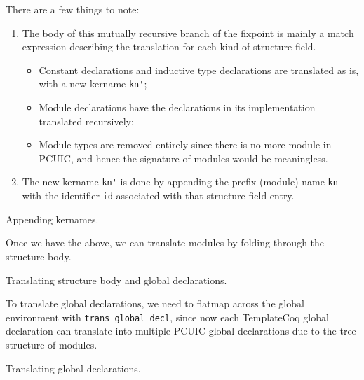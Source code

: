 There are a few things to note:
\begin{enumerate}
  \item The body of this mutually recursive branch of the fixpoint is mainly a
  match expression describing the translation for each kind of structure field.
  \begin{itemize}
    \item Constant declarations and inductive type declarations are translated
    as is, with a new kername \verb|kn'|;
    \item Module declarations have the declarations in its implementation
    translated recursively;
    \item Module types are removed entirely since there is no more module in
    PCUIC, and hence the signature of modules would be meaningless.
  \end{itemize} 
  \item The new kername \verb|kn'| is done by appending the prefix (module) name
  \verb|kn| with the identifier \verb|id| associated with that structure field
  entry.
\end{enumerate}

\begin{listing}[H]
  \caption{Appending kernames.}
  \label{lst:1-kn-append}
\end{listing}

Once we have the above, we can translate modules by folding through the
structure body.

\begin{listing}[H]
  \caption{Translating structure body and global declarations.}
  \label{lst:1-trans-sb}
\end{listing}

To translate global declarations, we need to flatmap across the global
environment with \verb|trans_global_decl|, since now each TemplateCoq global
declaration can translate into multiple PCUIC global declarations due to the
tree structure of modules.

\begin{listing}[H]
  \caption{Translating global declarations.}
  \label{lst:1-trans-env-gd}
\end{listing}

